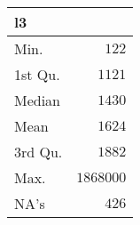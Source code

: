 %
\begin{table}[!tbp]
\begin{center}
\begin{tabular}{lr}
\hline\hline
\multicolumn{1}{l}{l3}&\multicolumn{1}{c}{}\tabularnewline
\hline
Min.&$    122$\tabularnewline
1st Qu.&$   1121$\tabularnewline
Median&$   1430$\tabularnewline
Mean&$   1624$\tabularnewline
3rd Qu.&$   1882$\tabularnewline
Max.&$1868000$\tabularnewline
NA's&$    426$\tabularnewline
\hline
\end{tabular}
\end{center}
\end{table}

